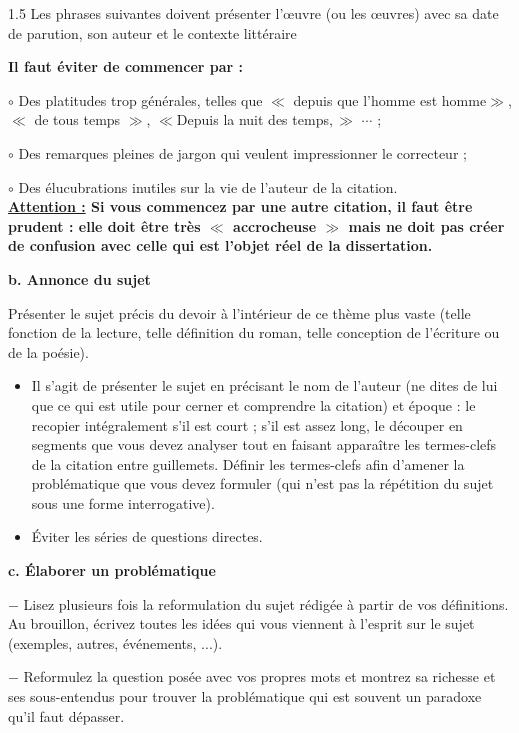 \documentclass[12pt]{article}
\begin{document}
\begin{spacing}{1.5}
Les phrases suivantes doivent présenter l'œuvre (ou les œuvres) avec sa 
date de parution, son auteur et le contexte littéraire
 
\textbf{ Il faut éviter de commencer par :}

$\circ$ Des platitudes trop générales, telles que $\ll$ depuis que l'homme est homme$\gg$, $\ll$ de tous temps $\gg$, $\ll$Depuis la nuit des temps$,\gg$ $\cdots$ ;

 $\circ$  Des remarques pleines de jargon qui veulent impressionner le correcteur ;

$\circ$ Des élucubrations inutiles sur la vie de l'auteur de la citation.\\ 



 
 
\textbf{\underline{ Attention :} Si vous commencez par une autre citation, il faut être prudent : elle 
doit être très $\ll$ accrocheuse $\gg$ mais ne doit pas créer de confusion avec celle qui est l'objet réel de la dissertation.}

\textbf{ b. Annonce du sujet}

 Présenter le sujet précis du devoir à l'intérieur de ce thème plus vaste (telle 
fonction de la lecture, telle définition du roman, telle conception de l'écriture 
ou de la poésie).

\begin{itemize}
\item Il s'agit de présenter le sujet en précisant le nom de l'auteur (ne dites de lui que ce qui est utile pour cerner et comprendre la citation) et époque : le recopier intégralement s'il est court ; s'il est assez long, le découper en segments que vous devez analyser tout en faisant apparaître les termes-clefs de la citation entre guillemets. Définir les termes-clefs afin d'amener la problématique que vous devez formuler (qui n'est pas la répétition du sujet sous une forme 
interrogative).
\item  Éviter les séries de questions directes.
\end{itemize}

\quad
\textbf{ c. Élaborer un problématique}

$-$ Lisez plusieurs fois la reformulation du sujet rédigée à partir de vos définitions. Au brouillon, écrivez toutes les idées qui vous viennent à l'esprit sur le sujet (exemples, autres, événements, ...).


$-$ Reformulez la question posée avec vos propres mots et montrez sa richesse et ses sous-entendus pour trouver la problématique qui est souvent un paradoxe qu'il faut dépasser.


\end{spacing}
\end{document}
